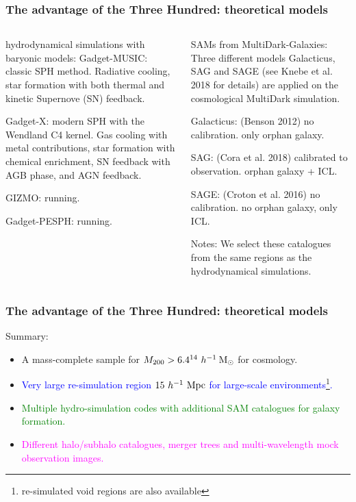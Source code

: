 \documentclass[aspectratio=43]{beamer}
\newcommand{\hMsun}{~h^{-1}\>{\rm M_\odot}}
\newcommand{\Mpc}{~h^{-1}~{\rm Mpc}}
\begin{document}
\begin{frame}
  \frametitle{The advantage of the Three Hundred: theoretical models}
  \vspace{-0.8cm}
  \begin{columns}[t]
    \begin{column}{0.5\textwidth}
      \begin{block}{hydrodynamical simulations with baryonic models:}
        {\sc Gadget-\alert{MUSIC}}: classic SPH method. Radiative cooling, star formation with both thermal and kinetic Supernove (SN) feedback.

        {\sc Gadget-\alert{X}}: modern SPH with the Wendland C4 kernel. Gas cooling with metal contributions, star formation with chemical enrichment, SN feedback with AGB phase, and AGN feedback.

        {\sc GIZMO:} running.

        {\sc Gadget-PESPH:} running.
      \end{block}
    \end{column}
    \begin{column}{0.48\textwidth}
      \begin{block}{SAMs from MultiDark-Galaxies:}
        Three different models \alert{\sc Galacticus}, \alert{\sc SAG} and \alert{\sc SAGE} (see Knebe et al. 2018 for details) are applied on the cosmological MultiDark simulation.

        {\sc Galacticus:} (Benson 2012) no calibration. only orphan galaxy.

        {\sc SAG:} (Cora et al. 2018) calibrated to observation. orphan galaxy + ICL.

        {\sc SAGE:} (Croton et al. 2016) no calibration. no orphan galaxy, only ICL.

        Notes: We select these catalogues from the same regions as the hydrodynamical simulations.
      \end{block}
    \end{column}
  \end{columns}
\end{frame}
\begin{frame}
  \frametitle{The advantage of the Three Hundred: theoretical models}
  \begin{center}
    {\huge Summary:}
  \end{center}
  \begin{itemize}
    \item \alert{A mass-complete sample for $M_{200} > 6.4 \time 10^{14} \hMsun$ for cosmology.}
    \item \textcolor{blue}{Very large re-simulation region $15 \Mpc$ for large-scale environments\footnote{re-simulated void regions are also available}.}
    \item \textcolor{green}{Multiple hydro-simulation codes with additional SAM catalogues for galaxy formation.}
    \item \textcolor{magenta}{Different halo/subhalo catalogues, merger trees and multi-wavelength mock observation images.}
  \end{itemize}
\end{frame}
\end{document}
